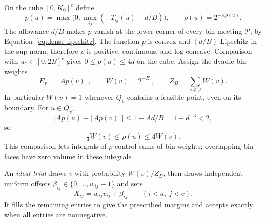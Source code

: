 On the cube $[0,K_0]^e$ define
\begin{equation}\label{eq:dense-penalty}
 p(u)=\max\bigl(0,\max_{ij}(-T_{ij}(u)-d/B)\bigr),
 \qquad \rho(u)=2^{-Ap(u)}.
\end{equation}
The allowance $d/B$ makes $p$ vanish at the lower corner of every bin
meeting $\mathcal P$, by Equation~\eqref{eq:dense-lipschitz}.
The function $p$ is convex and $(d/B)$-Lipschitz in the sup norm;
therefore $\rho$ is positive, continuous, and log-concave.  Comparison
with $u_*\in[0,2B]^e$ gives $0\le p(u)\le4d$ on the cube.
Assign the dyadic bin weights
\begin{equation}\label{eq:dense-bin-weights}
 E_v=\lfloor Ap(v)\rfloor,\qquad W(v)=2^{-E_v},
 \qquad Z_B=\sum_{v\in\mathcal V}W(v).
\end{equation}
In particular $W(v)=1$ whenever $Q_v$ contains a feasible point, even
on its boundary.  For $u\in Q_v$,
\[
 \bigl|Ap(u)-\lfloor Ap(v)\rfloor\bigr|
 \le 1+Ad/B=1+d^{-3}<2,
\]
so
\begin{equation}\label{eq:bin-density-comparison}
 \tfrac14W(v)\le\rho(u)\le4W(v).
\end{equation}
This comparison lets integrals of $\rho$ control sums of bin weights;
overlapping bin faces have zero volume in these integrals.

An \emph{ideal trial} draws $v$ with probability $W(v)/Z_B$, then draws
independent uniform offsets $\beta_{ij}\in\{0,\ldots,w_{ij}-1\}$ and sets
\begin{equation}\label{eq:dense-offset-output}
 X_{ij}=w_{ij}v_{ij}+\beta_{ij}\qquad(i<a,\ j<c).
\end{equation}
It fills the remaining entries to give the prescribed margins and
accepts exactly when all entries are nonnegative.

